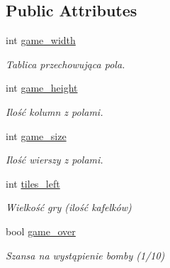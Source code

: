 \subsection*{Public Attributes}
\begin{DoxyCompactItemize}
\item 
\mbox{\label{class_saper_1_1_game_ac555ca6b549cd5db36344c44d30f628d}} 
int \mbox{\hyperlink{class_saper_1_1_game_ac555ca6b549cd5db36344c44d30f628d}{game\+\_\+width}}
\begin{DoxyCompactList}\small\item\em Tablica przechowująca pola. \end{DoxyCompactList}\item 
\mbox{\label{class_saper_1_1_game_a4384a168c23e724b445de95a6af206ff}} 
int \mbox{\hyperlink{class_saper_1_1_game_a4384a168c23e724b445de95a6af206ff}{game\+\_\+height}}
\begin{DoxyCompactList}\small\item\em Ilość kolumn z polami. \end{DoxyCompactList}\item 
\mbox{\label{class_saper_1_1_game_a784f5ee2db8e065581bea6885af146a9}} 
int \mbox{\hyperlink{class_saper_1_1_game_a784f5ee2db8e065581bea6885af146a9}{game\+\_\+size}}
\begin{DoxyCompactList}\small\item\em Ilość wierszy z polami. \end{DoxyCompactList}\item 
\mbox{\label{class_saper_1_1_game_a3acb80304c24bc43f5002d3ce578e7b9}} 
int \mbox{\hyperlink{class_saper_1_1_game_a3acb80304c24bc43f5002d3ce578e7b9}{tiles\+\_\+left}}
\begin{DoxyCompactList}\small\item\em Wielkość gry (ilość kafelków) \end{DoxyCompactList}\item 
\mbox{\label{class_saper_1_1_game_a34bdb6551f2f859d65cd424b97c48d74}} 
bool \mbox{\hyperlink{class_saper_1_1_game_a34bdb6551f2f859d65cd424b97c48d74}{game\+\_\+over}}
\begin{DoxyCompactList}\small\item\em Szansa na wystąpienie bomby (1/10) \end{DoxyCompactList}\item 

\end{DoxyCompactItemize}
